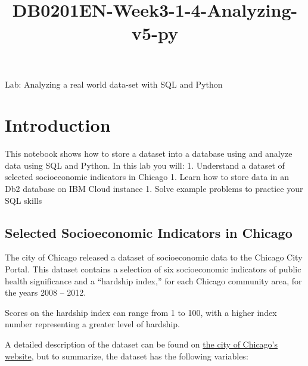 \documentclass[11pt]{article}
\title{DB0201EN-Week3-1-4-Analyzing-v5-py}
\begin{document}
    
    \maketitle
    
    

    
    Lab: Analyzing a real world data-set with SQL and Python

    \hypertarget{introduction}{%
\section{Introduction}\label{introduction}}

This notebook shows how to store a dataset into a database using and
analyze data using SQL and Python. In this lab you will: 1. Understand a
dataset of selected socioeconomic indicators in Chicago 1. Learn how to
store data in an Db2 database on IBM Cloud instance 1. Solve example
problems to practice your SQL skills

    \hypertarget{selected-socioeconomic-indicators-in-chicago}{%
\subsection{Selected Socioeconomic Indicators in
Chicago}\label{selected-socioeconomic-indicators-in-chicago}}

The city of Chicago released a dataset of socioeconomic data to the
Chicago City Portal. This dataset contains a selection of six
socioeconomic indicators of public health significance and a ``hardship
index,'' for each Chicago community area, for the years 2008 -- 2012.

Scores on the hardship index can range from 1 to 100, with a higher
index number representing a greater level of hardship.

A detailed description of the dataset can be found on
\href{https://data.cityofchicago.org/Health-Human-Services/Census-Data-Selected-socioeconomic-indicators-in-C/kn9c-c2s2}{the
city of Chicago's website}, but to summarize, the dataset has the
following variables:
\end{document}

